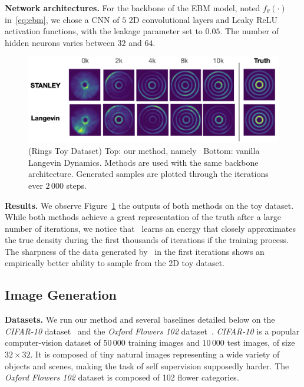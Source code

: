 \documentclass[letterpaper]{article} %
\begin{document}
\medskip
\textbf{Network architectures.} 
For the backbone of the EBM model, noted $f_\theta(\cdot)$ in~\eqref{eq:ebm}, we chose a CNN of $5$ 2D convolutional layers and Leaky ReLU activation functions, with the leakage parameter set to $0.05$.
The number of hidden neurons varies between $32$ and $64$.


\begin{figure}[H]
\includegraphics[width=1.02\linewidth]{figs/rings}
   \caption{(Rings Toy Dataset) Top: our method, namely \algo\ Bottom: vanilla Langevin Dynamics. 
   Methods are used with the same backbone architecture. Generated samples are plotted through the iterations ever $2\,000$ steps.}
\label{fig:resultstoy}
\end{figure}


\textbf{Results.} 
We observe Figure~\ref{fig:resultstoy} the outputs of both methods on the toy dataset.
While both methods achieve a great representation of the truth after a large number of iterations, we notice that \algo\ learns an energy that closely approximates the true density during the first thousands of iterations if the training process.
The sharpness of the data generated by \algo\ in the first iterations shows an empirically better ability to sample from the 2D toy dataset.

\subsection{Image Generation}

\quad\textbf{Datasets.}
We run our method and several baselines detailed below on the \textit{CIFAR-10} dataset~\cite{krizhevsky2009learning} and the \emph{Oxford Flowers 102} dataset~\cite{nilsback2008automated}.
\textit{CIFAR-10}  is a popular computer-vision dataset of $50\,000$ training images and $10\,000$ test images, of size $32\times 32$. 
It is composed of tiny natural images representing a wide variety of objects and scenes, making the task of self supervision supposedly harder.
The \emph{Oxford Flowers 102} dataset is composed of 102 flower categories.
\end{document}
